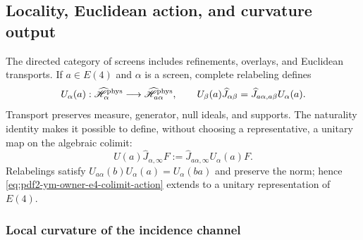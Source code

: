 \subsection{Locality, Euclidean action, and curvature output}

The directed category of screens includes refinements, overlays, and Euclidean
transports. If $a\in E(4)$ and $\alpha$ is a screen, complete relabeling defines
\begin{equation}\label{eq:pdf2-ym-owner-e4-finite-transport}
 U_\alpha(a):\widehat{\mathscr H}_\alpha^{\rm phys}
 \longrightarrow\widehat{\mathscr H}_{a\alpha}^{\rm phys},
 \qquad
 U_\beta(a)\widehat J_{\alpha\beta}
 =\widehat J_{a\alpha,a\beta}U_\alpha(a).
\end{equation}
Transport preserves measure, generator, null ideals, and supports. The naturality
identity makes it possible to define, without choosing a representative, a unitary map on the algebraic
colimit:
\begin{equation}\label{eq:pdf2-ym-owner-e4-colimit-action}
 U(a)\widehat J_{\alpha,\infty}F
 :=\widehat J_{a\alpha,\infty}U_\alpha(a)F.
\end{equation}
Relabelings satisfy $U_{a\alpha}(b)U_\alpha(a)=U_\alpha(ba)$ and preserve
the norm; hence \eqref{eq:pdf2-ym-owner-e4-colimit-action} extends to a
unitary representation of $E(4)$.

\subsubsection{Local curvature of the incidence channel}

